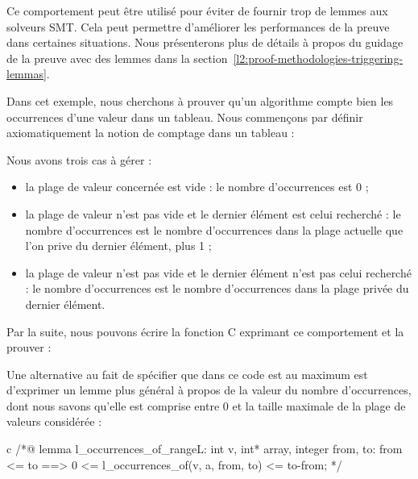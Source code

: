 Ce comportement peut être utilisé pour éviter de fournir trop de lemmes aux
solveurs SMT. Cela peut permettre d'améliorer les performances de la preuve
dans certaines situations. Nous présenterons plus de détails à propos du guidage
de la preuve avec des lemmes dans la
section~\ref{l2:proof-methodologies-triggering-lemmas}.




Dans cet exemple, nous cherchons à prouver qu'un algorithme compte bien les
occurrences d'une valeur dans un tableau. Nous commençons par définir
axiomatiquement la notion de comptage dans un tableau :





Nous avons trois cas à gérer :
\begin{itemize}
\item la plage de valeur concernée est vide : le nombre d'occurrences est 0 ;
\item la plage de valeur n'est pas vide et le dernier élément est celui recherché :
le nombre d'occurrences est le nombre d'occurrences dans la plage actuelle que
l'on prive du dernier élément, plus 1 ;
\item la plage de valeur n'est pas vide et le dernier élément n'est pas celui
recherché : le nombre d'occurrences est le nombre d'occurrences dans la plage
privée du dernier élément.
\end{itemize}


Par la suite, nous pouvons écrire la fonction C exprimant ce comportement et la
prouver :






Une alternative au fait de spécifier que dans ce code  est au
maximum  est d'exprimer un lemme plus général à propos de la valeur
du nombre d'occurrences, dont nous savons qu'elle est comprise entre 0 et
la taille maximale de la plage de valeurs considérée :



\begin{CodeBlock}{c}
/*@
lemma l_occurrences_of_range{L}:
  \forall int v, int* array, integer from, to:
    from <= to ==> 0 <= l_occurrences_of(v, a, from, to) <= to-from;
*/
\end{CodeBlock}



